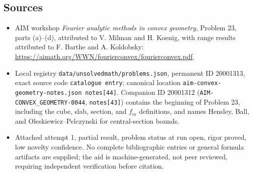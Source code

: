 \documentclass[11pt]{article}
\begin{document}
\subsection{Sources}
\begin{itemize}
\item AIM workshop \emph{Fourier analytic methods in convex geometry}, Problem 23, parts (a)--(d), attributed to V. Milman and H. Koenig, with range results attributed to F. Barthe and A. Koldobsky: \url{https://aimath.org/WWN/fourierconvex/fourierconvex.pdf}.
\item Local registry \texttt{data/unsolvedmath/problems.json}, permanent ID 20001313, exact source code \texttt{catalogue entry}; canonical location \texttt{aim-convex-geometry-notes.json notes[44]}. Companion ID 20001312 (\texttt{AIM-CONVEX\_GEOMETRY-0044}, \texttt{notes[43]}) contains the beginning of Problem 23, including the cube, slab, section, and $f_m$ definitions, and names Hensley, Ball, and Oleskiewicz--Pelczynski for central-section bounds.
\item Attached attempt 1, partial result, problem status at run open, rigor proved, low novelty confidence. No complete bibliographic entries or general formula artifacts are supplied; the aid is machine-generated, not peer reviewed, requiring independent verification before citation.
\end{itemize}
\end{document}
